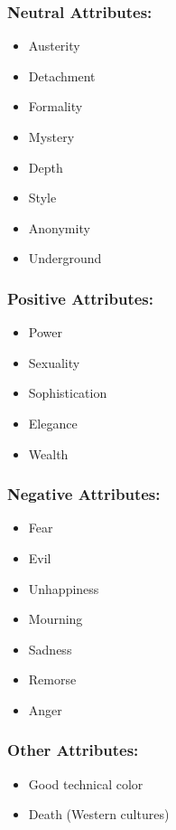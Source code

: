 \documentclass[openleft,oneside,showtrims]{memoir}
\begin{document}
\subsubsection*{Neutral Attributes:}
\label{sec:org5260fba}

\begin{itemize}
\item Austerity
\item Detachment
\item Formality
\item Mystery
\item Depth
\item Style
\item Anonymity
\item Underground
\end{itemize}

\subsubsection*{Positive Attributes:}
\label{sec:orga8304f1}

\begin{itemize}
\item Power
\item Sexuality
\item Sophistication
\item Elegance
\item Wealth
\end{itemize}

\subsubsection*{Negative Attributes:}
\label{sec:org8da6af8}

\begin{itemize}
\item Fear
\item Evil
\item Unhappiness
\item Mourning
\item Sadness
\item Remorse
\item Anger
\end{itemize}

\subsubsection*{Other Attributes:}
\label{sec:orgbc62103}

\begin{itemize}
\item Good technical color
\item Death (Western cultures)
\end{itemize}
\end{document}
